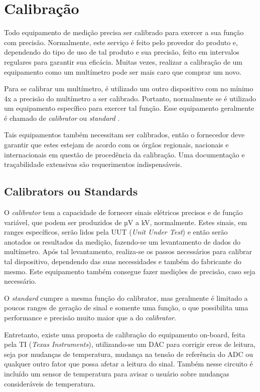 \section{Calibração}\label{sec:Calibration}

Todo equipamento de medição precisa ser calibrado para exercer a sua função com precisão. Normalmente, este serviço é feito pelo provedor do produto e, dependendo do tipo de uso de tal produto e sua precisão, feito em intervalos regulares para garantir sua eficácia. Muitas vezes, realizar a calibração de um equipamento como um multímetro pode ser mais caro que comprar um novo.

Para se calibrar um multímetro, é utilizado um outro dispositivo com no mínimo 4x a precisão do multímetro a ser calibrado. Portanto, normalmente se é utilizado um equipamento específico para exercer tal função. Esse equipamento geralmente é chamado de \textit{calibrator} ou \textit{standard} \cite{flukecalib}. %

Tais equipamentos também necessitam ser calibrados, então o fornecedor deve garantir que estes estejam de acordo com os órgãos regionais, nacionais e internacionais em questão de procedência da calibração. Uma documentação e traçabilidade extensivas são requerimentos indispensáveis.

    \subsection{Calibrators ou Standards}\label{subsec:Calibrators}

    O \textit{calibrator} tem a capacidade de fornecer sinais elétricos precisos e de função variável, que podem ser produzidos de µV a kV, normalmente. Estes sinais, em ranges específicos, serão lidos pela \gls{UUT} (\textit{Unit Under Test}) e então serão anotados os resultados da medição, fazendo-se um levantamento de dados do multímetro. Após tal levantamento, realiza-se os passos necessários para calibrar tal dispositivo, dependendo das suas necessidades e também do fabricante do mesmo. Este equipamento também consegue fazer medições de precisão, caso seja necessário. 

    O \textit{standard} cumpre a mesma função do calibrator, mas geralmente é limitado a poucos ranges de geração de sinal e somente uma função, o que possibilita uma performance e precisão muito maior que a do \textit{calibrator}. 

Entretanto, existe uma proposta de calibração do equipamento on-board, feita pela \gls{TI} (\textit{Texas Instruments}), utilizando-se um \gls{DAC} para corrigir erros de leitura, seja por mudanças de temperatura, mudança na tensão de referência do \gls{ADC} ou qualquer outro fator que possa afetar a leitura do sinal. Também nesse circuito é incluído um sensor de temperatura para avisar o usuário sobre mudanças consideráveis de temperatura.

